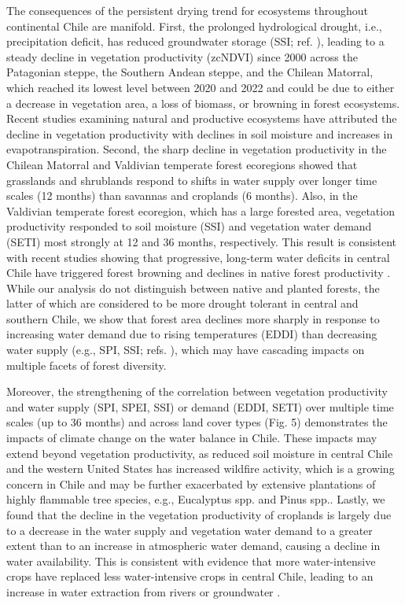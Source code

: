 \documentclass[
  sn-nature,
  numbered]{sn-jnl}
\begin{document}
The consequences of the persistent drying trend for ecosystems
throughout continental Chile are manifold. First, the prolonged
hydrological drought, i.e., precipitation deficit, has reduced
groundwater storage (SSI; ref. \citep{Taucare2024}), leading to a steady
decline in vegetation productivity (zcNDVI) since 2000 across the
Patagonian steppe, the Southern Andean steppe, and the Chilean Matorral,
which reached its lowest level between 2020 and 2022 and could be due to
either a decrease in vegetation area, a loss of biomass, or browning in
forest ecosystems. Recent studies examining natural and productive
ecosystems\citep{Nicolai-Shaw2017, Jiang2020, Zhou2021} have attributed
the decline in vegetation productivity with declines in soil moisture
and increases in evapotranspiration. Second, the sharp decline in
vegetation productivity in the Chilean Matorral and Valdivian temperate
forest ecoregions showed that grasslands and shrublands respond to
shifts in water supply over longer time scales (12 months) than savannas
and croplands (6 months). Also, in the Valdivian temperate forest
ecoregion, which has a large forested area, vegetation productivity
responded to soil moisture (SSI) and vegetation water demand (SETI) most
strongly at 12 and 36 months, respectively. This result is consistent
with recent studies showing that progressive, long-term water deficits
in central Chile have triggered forest browning and declines in native
forest productivity \citep{Miranda2023, Miranda2020, Venegas2022}. While
our analysis do not distinguish between native and planted forests, the
latter of which are considered to be more drought tolerant in central
and southern Chile\citep{Carrasco2022}, we show that forest area
declines more sharply in response to increasing water demand due to
rising temperatures (EDDI) than decreasing water supply (e.g., SPI, SSI;
refs. \citep{Fajardo2019, Holz2018}), which may have cascading impacts
on multiple facets of forest diversity\citep{Segovia2021, Sabatini2022}.

Moreover, the strengthening of the correlation between vegetation
productivity and water supply (SPI, SPEI, SSI) or demand (EDDI, SETI)
over multiple time scales (up to 36 months) and across land cover types
(Fig. 5) demonstrates the impacts of climate change on the water balance
in Chile. These impacts may extend beyond vegetation productivity, as
reduced soil moisture in central Chile and the western United States has
increased wildfire activity\citep{Holden2018, Gonzalez2018}, which is a
growing concern in Chile and may be further exacerbated by extensive
plantations of highly flammable tree species, e.g., Eucalyptus spp. and
Pinus spp.\citep{Bowman2019}. Lastly, we found that the decline in the
vegetation productivity of croplands is largely due to a decrease in the
water supply and vegetation water demand to a greater extent than to an
increase in atmospheric water demand\citep{Quiring2010}, causing a
decline in water availability. This is consistent with evidence that
more water-intensive crops have replaced less water-intensive crops in
central Chile, leading to an increase in water extraction from rivers or
groundwater \citep{Munoz2020, Duran2020}.
\end{document}
